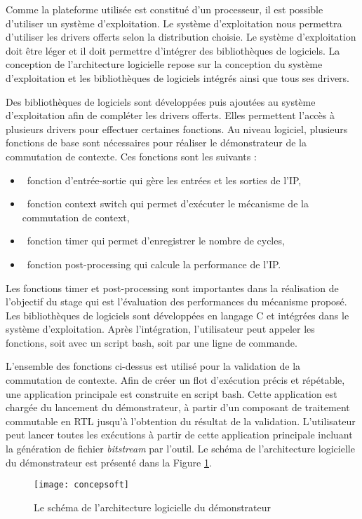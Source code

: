 Comme la plateforme utilisée est constitué d'un processeur, il est possible d'utiliser un système d'exploitation.
Le système d'exploitation nous permettra d'utiliser les drivers offerts selon la distribution choisie. 
Le système d'exploitation doit être léger et il doit permettre d'intégrer des bibliothèques de logiciels.
La conception de l'architecture logicielle repose sur la conception du système d'exploitation et les
bibliothèques de logiciels intégrés ainsi que tous ses drivers. 

Des bibliothèques de logiciels sont développées puis ajoutées au système d'exploitation afin de compléter les drivers offerts. 
Elles permettent l'accès à plusieurs drivers pour effectuer certaines fonctions.
Au niveau logiciel, plusieurs fonctions de base sont nécessaires pour réaliser le démonstrateur de la commutation
de contexte. Ces fonctions sont les suivants :
\begin{itemize}
	\item\ fonction d'entrée-sortie qui gère les entrées et les sorties de l'IP, 
	\item\ fonction context switch qui permet d'exécuter le mécanisme de la commutation de context, 
	\item\ fonction timer qui permet d'enregistrer le nombre de cycles,
	\item\ fonction post-processing qui calcule la performance de l'IP.
\end{itemize}
Les fonctions timer et post-processing sont importantes dans la réalisation de l'objectif du stage qui est l'évaluation des performances
du mécanisme proposé. Les bibliothèques de logiciels sont développées en langage C et intégrées dans le système d'exploitation.
Après l'intégration, l'utilisateur peut appeler les fonctions, soit avec un script bash, soit par une ligne de commande.

L'ensemble des fonctions ci-dessus est utilisé pour la validation de la commutation de contexte.
Afin de créer un flot d'exécution précis et répétable, une application principale est construite en script bash. 
Cette application est chargée du lancement du démonstrateur, à partir d'un composant de traitement commutable en RTL jusqu'à l'obtention du résultat de la validation.
L'utilisateur peut lancer toutes les exécutions à partir de cette application principale incluant la génération de fichier
\emph{bitstream} par l'outil.
Le schéma de l'architecture logicielle du démonstrateur est présenté dans la Figure \ref{fig:concepsoft}.

\begin{figure}[h]
	\centering
	\texttt{[image: concepsoft]}
	\caption{Le schéma de l'architecture logicielle du démonstrateur}
	\label{fig:concepsoft}
	\vspace{-2mm}
\end{figure}

